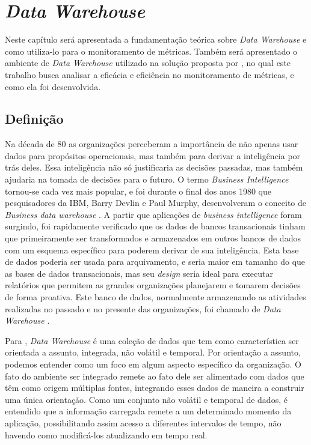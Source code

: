 \chapter{\textit{Data Warehouse}} 
\label{chap:arquitetura}

Neste capítulo será apresentada a fundamentação teórica sobre \textit{Data Warehouse} e como utiliza-lo para o monitoramento de métricas. Também será apresentado o ambiente de \textit{Data Warehouse} utilizado na solução proposta por , no qual este trabalho busca analisar a eficácia e eficiência no monitoramento de métricas,  e como ela foi desenvolvida.  

\section{Definição}

Na década de 80 as organizações perceberam a importância de não apenas usar dados para propósitos operacionais, mas também para derivar a inteligência por trás deles. Essa inteligência não só justificaria as decisões passadas, mas também ajudaria na tomada de decisões para o futuro. O termo \textit{Business Intelligence} tornou-se cada vez mais popular, e foi durante o final dos anos 1980 que pesquisadores da IBM, Barry Devlin e Paul Murphy, desenvolveram o conceito de \textit{Business data warehouse }. A partir que aplicações de \textit{business intelligence } foram surgindo, foi rapidamente verificado que os dados de bancos transacionais tinham que primeiramente ser transformados e armazenados em outros bancos de dados com um esquema específico para poderem derivar de sua inteligência. Esta base de dados poderia ser usada para arquivamento, e seria maior em tamanho do que as bases de dados transacionais, mas seu \textit{design} seria ideal para executar relatórios que permitem as grandes organizações planejarem e tomarem decisões de forma proativa. Este banco de dados, normalmente armazenando as atividades realizadas no passado e no presente das organizações, foi chamado de \textit{Data Warehouse} \cite{neeraj_sharma_2011}.

Para , \textit{Data Warehouse} é uma coleção de dados que tem como característica ser orientada a assunto, integrada, não volátil e temporal. Por orientação a assunto, podemos entender como um foco em algum aspecto específico da organização. O fato do ambiente ser integrado remete ao fato dele ser alimentado com dados que têm como origem múltiplas fontes, integrando esses dados de maneira a construir uma única orientação. Como um conjunto não volátil e temporal de dados, é entendido que a informação carregada remete a um determinado momento da aplicação, possibilitando assim acesso a diferentes intervalos de tempo, não havendo como modificá-los atualizando em tempo real.

